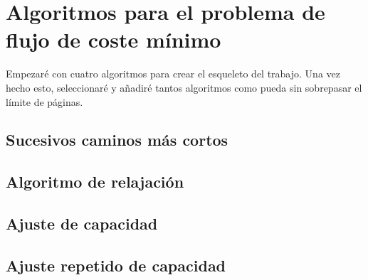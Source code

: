 \section{Algoritmos para el problema de flujo de coste mínimo}
Empezaré con cuatro algoritmos para crear el esqueleto del trabajo. Una vez hecho esto, seleccionaré y añadiré tantos algoritmos como pueda sin sobrepasar el límite de páginas.


\subsection{Sucesivos caminos más cortos}
\label{subsec:2.1}

\subsection{Algoritmo de relajación}


\subsection{Ajuste de capacidad}


\subsection{Ajuste repetido de capacidad}
